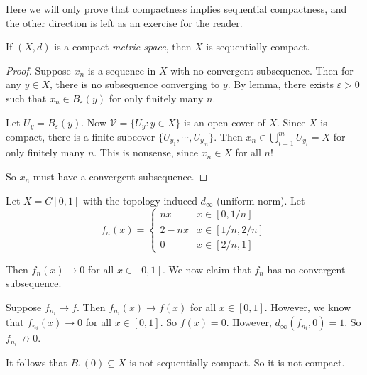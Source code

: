 \documentclass[a4paper]{article}
\begin{document}
Here we will only prove that compactness implies sequential compactness, and the other direction is left as an exercise for the reader.
\begin{thm}[]
  If $(X, d)$ is a compact \emph{metric space}, then $X$ is sequentially compact.
\end{thm}

\begin{proof}
  Suppose $x_n$ is a sequence in $X$ with no convergent subsequence. Then for any $y\in X$, there is no subsequence converging to $y$. By lemma, there exists $\varepsilon > 0$ such that $x_n\in B_\varepsilon (y)$ for only finitely many $n$.

  Let $U_y = B_\varepsilon (y)$. Now $\mathcal{V} = \{U_y: y\in X\}$ is an open cover of $X$. Since $X$ is compact, there is a finite subcover $\{U_{y_1}, \cdots, U_{y_m}\}$. Then $x_n \in \bigcup_{i = 1}^m U_{y_i} = X$ for only finitely many $n$. This is nonsense, since $x_n \in X$ for all $n$!

  So $x_n$ must have a convergent subsequence.
\end{proof}

\begin{eg}
  Let $X = C[0, 1]$ with the topology induced $d_\infty$ (uniform norm). Let
  \[
    f_n(x) =
    \begin{cases}
      nx & x\in [0, 1/n]\\
      2 - nx & x\in [1/n, 2/n]\\
      0 & x \in [2/n, 1]
    \end{cases}
  \]
  \begin{center}
  \end{center}
  Then $f_n(x) \to 0$ for all $x\in [0, 1]$. We now claim that $f_n$ has no convergent subsequence.

  Suppose $f_{n_i} \to f$. Then $f_{n_i}(x) \to f(x)$ for all $x\in [0, 1]$. However, we know that $f_{n_i}(x) \to 0$ for all $x\in [0, 1]$. So $f(x) = 0$. However, $d_{\infty}(f_{n_i}, 0) = 1$. So $f_{n_i}\not \to 0$.

  It follows that $B_1(0)\subseteq X$ is not sequentially compact. So it is not compact.
\end{eg}
\end{document}
